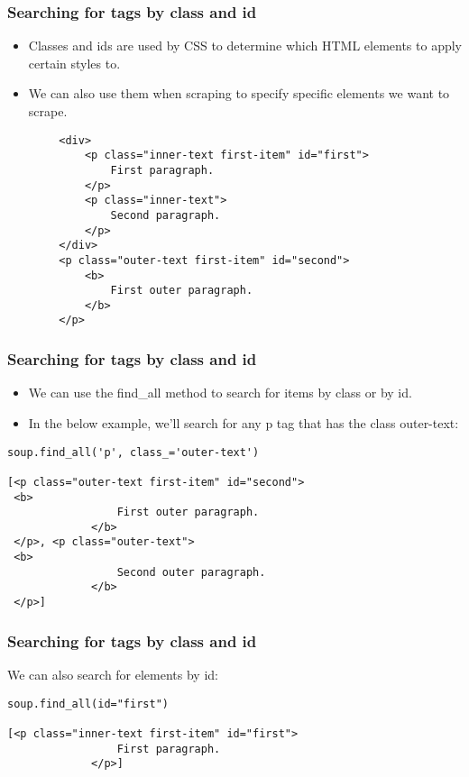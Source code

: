 \begin{frame}[fragile]\frametitle{Searching for tags by class and id}
    \begin{itemize}
    \item Classes and ids are used by CSS to determine which HTML elements to apply certain styles to. 
    \item We can also use them when scraping to specify specific elements we want to scrape. 
    \end{itemize}
            \begin{lstlisting}
        <div>
            <p class="inner-text first-item" id="first">
                First paragraph.
            </p>
            <p class="inner-text">
                Second paragraph.
            </p>
        </div>
        <p class="outer-text first-item" id="second">
            <b>
                First outer paragraph.
            </b>
        </p>
\end{lstlisting}
\end{frame}

\begin{frame}[fragile]\frametitle{Searching for tags by class and id}
    \begin{itemize}
    \item We can use the find\_all method to search for items by class or by id. 
    \item In the below example, we'll search for any p tag that has the class outer-text:
    \end{itemize}
            \begin{lstlisting}
soup.find_all('p', class_='outer-text')

[<p class="outer-text first-item" id="second">
 <b>
                 First outer paragraph.
             </b>
 </p>, <p class="outer-text">
 <b>
                 Second outer paragraph.
             </b>
 </p>]
\end{lstlisting}
\end{frame}

\begin{frame}[fragile]\frametitle{Searching for tags by class and id}
We can also search for elements by id:
            \begin{lstlisting}
soup.find_all(id="first")

[<p class="inner-text first-item" id="first">
                 First paragraph.
             </p>]
\end{lstlisting}
\end{frame}

